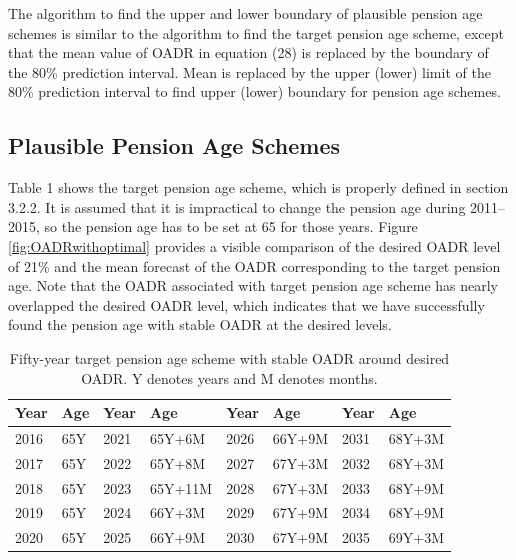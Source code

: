 \documentclass[11pt,a4paper,]{article}
\begin{document}
The algorithm to find the upper and lower boundary of plausible pension
age schemes is similar to the algorithm to find the target pension age
scheme, except that the mean value of OADR in equation (28) is replaced
by the boundary of the 80\% prediction interval. Mean is replaced by the
upper (lower) limit of the 80\% prediction interval to find upper
(lower) boundary for pension age schemes.

\subsection{Plausible Pension Age
Schemes}\label{plausible-pension-age-schemes}

Table 1 shows the target pension age scheme, which is properly defined
in section 3.2.2. It is assumed that it is impractical to change the
pension age during 2011--2015, so the pension age has to be set at 65
for those years. Figure \ref{fig:OADRwithoptimal} provides a visible
comparison of the desired OADR level of 21\% and the mean forecast of
the OADR corresponding to the target pension age. Note that the OADR
associated with target pension age scheme has nearly overlapped the
desired OADR level, which indicates that we have successfully found the
pension age with stable OADR at the desired levels.

\begin{table}[t]

\caption{\label{tab:pensionagetables}Fifty-year target pension age scheme with stable OADR around desired OADR. Y denotes years and M denotes months.}
\centering
\begin{tabular}{llllllll}
\toprule
Year & Age & Year & Age & Year & Age & Year & Age\\
\midrule
2016 & 65Y & 2021 & 65Y+6M & 2026 & 66Y+9M & 2031 & 68Y+3M\\
2017 & 65Y & 2022 & 65Y+8M & 2027 & 67Y+3M & 2032 & 68Y+3M\\
2018 & 65Y & 2023 & 65Y+11M & 2028 & 67Y+3M & 2033 & 68Y+9M\\
2019 & 65Y & 2024 & 66Y+3M & 2029 & 67Y+9M & 2034 & 68Y+9M\\
2020 & 65Y & 2025 & 66Y+9M & 2030 & 67Y+9M & 2035 & 69Y+3M\\
\bottomrule
\end{tabular}
\end{table}
\end{document}
